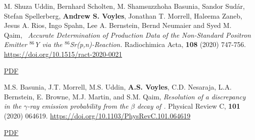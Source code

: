 \begin{bibsection}

% 






\item M. Shuza Uddin, Bernhard Scholten, M. Shamsuzzhoha Basunia, Sandor Sudár, Stefan Spellerberg, \textbf{Andrew S. Voyles}, Jonathan T. Morrell, Haleema Zaneb, Jesus A. Rios, Ingo Spahn, Lee A. Bernstein, Bernd Neumaier and Syed M. Qaim, \ \emph{Accurate Determination of Production Data of the Non-Standard Positron Emitter $^{86}$Y via the $^{86}$Sr(p,n)-Reaction.} Radiochimica Acta, \textbf{108} (2020) 747-756. \url{https://doi.org/10.1515/ract-2020-0021} 

\ifshort \vspace{0.1cm} \href{https://avoyles.github.io/papers/Uddin2020_86Y.pdf}{\underline{PDF}} \else  \fi 

\item M.S. Basunia, J.T. Morrell, M.S. Uddin, \textbf{A.S. Voyles}, C.D. Nesaraja, L.A. Bernstein, E. Browne, M.J. Martin, and S.M. Qaim, \emph{Resolution of a discrepancy in the $\gamma$-ray emission probability from the $\beta$ decay of .} Physical Review C, \textbf{101} (2020) 064619. \url{https://doi.org/10.1103/PhysRevC.101.064619} 

\ifshort \vspace{0.1cm} \href{https://avoyles.github.io/papers/Basunia2020_BR.pdf}{\underline{PDF}} \else  \fi 






\end{bibsection}
